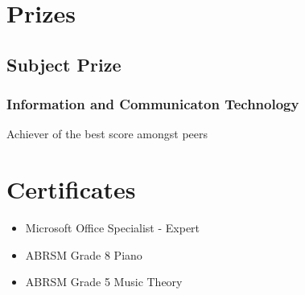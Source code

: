 \documentclass{article}
\begin{document}
\noindent\begin{minipage}{\textwidth}
    \noindent\begin{minipage}[t]{0.5\textwidth}
        \section*{Prizes}
            \subsection*{Subject Prize}
                \subsubsection*{Information and Communicaton Technology}
                    Achiever of the best score amongst peers
    \end{minipage}%
    \begin{minipage}[t]{0.5\textwidth}
        \section*{Certificates}
            \begin{itemize}
                \item Microsoft Office Specialist - Expert
                \item ABRSM Grade 8 Piano
                \item ABRSM Grade 5 Music Theory
            \end{itemize}
    \end{minipage}
\end{minipage}
\vspace{3em}
\end{document}
